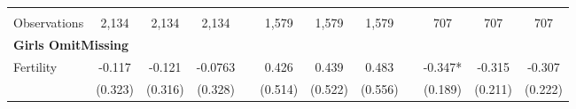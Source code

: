 \begin{landscape}
\begin{table}[htpb!]
\begin{center}
\begin{tabular}{lcccp{2mm}cccp{2mm}ccc}
\begin{footnotesize}\end{footnotesize}&\begin{footnotesize}\end{footnotesize}&\begin{footnotesize}\end{footnotesize}&\begin{footnotesize}\end{footnotesize}&\begin{footnotesize}\end{footnotesize}&\begin{footnotesize}\end{footnotesize}&\begin{footnotesize}\end{footnotesize}&\begin{footnotesize}\end{footnotesize}&\begin{footnotesize}\end{footnotesize}&\begin{footnotesize}\end{footnotesize}&\begin{footnotesize}\end{footnotesize}&\begin{footnotesize}\end{footnotesize}\\Observations&2,134&2,134&2,134&&1,579&1,579&1,579&&707&707&707\\
\multicolumn{12}{l}{\textbf{Girls OmitMissing}}\\ 
Fertility&-0.117&-0.121&-0.0763&&0.426&0.439&0.483&&-0.347*&-0.315&-0.307\\
&(0.323)&(0.316)&(0.328)&&(0.514)&(0.522)&(0.556)&&(0.189)&(0.211)&(0.222)\\

\end{tabular}
\end{center}
\end{table}
\end{landscape}

